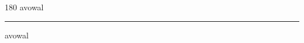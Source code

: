 
\begin{frame}
\begin{center}
\begin{turn}{180}
{\fontsize{2.5cm}{1em}\selectfont avowal}
\end{turn}
\vspace{1em}\par  
\hrule
\vspace{1em}\par  
{\fontsize{2.5cm}{1em}\selectfont avowal}
\end{center}
\end{frame}
